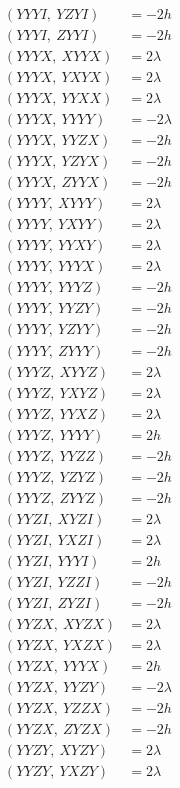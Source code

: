 \documentclass{article}
\begin{document}
\begin{align*}
  (YYYI,\ YZYI) &= - 2 h \\
  (YYYI,\ ZYYI) &= - 2 h \\
  (YYYX,\ XYYX) &= 2 \lambda \\
  (YYYX,\ YXYX) &= 2 \lambda \\
  (YYYX,\ YYXX) &= 2 \lambda \\
  (YYYX,\ YYYY) &= - 2 \lambda \\
  (YYYX,\ YYZX) &= - 2 h \\
  (YYYX,\ YZYX) &= - 2 h \\
  (YYYX,\ ZYYX) &= - 2 h \\
  (YYYY,\ XYYY) &= 2 \lambda \\
  (YYYY,\ YXYY) &= 2 \lambda \\
  (YYYY,\ YYXY) &= 2 \lambda \\
  (YYYY,\ YYYX) &= 2 \lambda \\
  (YYYY,\ YYYZ) &= - 2 h \\
  (YYYY,\ YYZY) &= - 2 h \\
  (YYYY,\ YZYY) &= - 2 h \\
  (YYYY,\ ZYYY) &= - 2 h \\
  (YYYZ,\ XYYZ) &= 2 \lambda \\
  (YYYZ,\ YXYZ) &= 2 \lambda \\
  (YYYZ,\ YYXZ) &= 2 \lambda \\
  (YYYZ,\ YYYY) &= 2 h \\
  (YYYZ,\ YYZZ) &= - 2 h \\
  (YYYZ,\ YZYZ) &= - 2 h \\
  (YYYZ,\ ZYYZ) &= - 2 h \\
  (YYZI,\ XYZI) &= 2 \lambda \\
  (YYZI,\ YXZI) &= 2 \lambda \\
  (YYZI,\ YYYI) &= 2 h \\
  (YYZI,\ YZZI) &= - 2 h \\
  (YYZI,\ ZYZI) &= - 2 h \\
  (YYZX,\ XYZX) &= 2 \lambda \\
  (YYZX,\ YXZX) &= 2 \lambda \\
  (YYZX,\ YYYX) &= 2 h \\
  (YYZX,\ YYZY) &= - 2 \lambda \\
  (YYZX,\ YZZX) &= - 2 h \\
  (YYZX,\ ZYZX) &= - 2 h \\
  (YYZY,\ XYZY) &= 2 \lambda \\
  (YYZY,\ YXZY) &= 2 \lambda \\

\end{align*}
\end{document}
